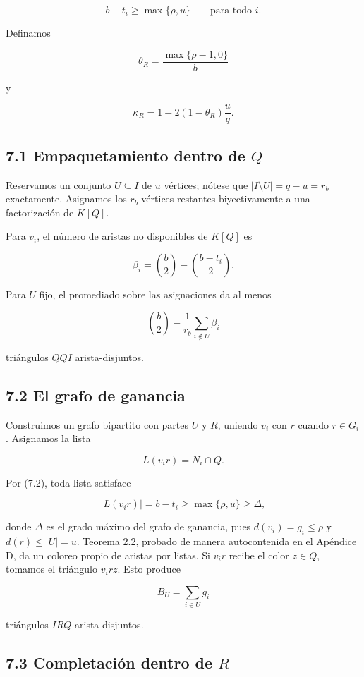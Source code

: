\documentclass[spanish,11pt,a4paper]{article}
\begin{document}
\[
b-t_i\ge\max\{\rho,u\}
\qquad
\text{para todo }i.
\tag{7.2}
\]

Definamos

\[
\theta_R=\frac{\max\{\rho-1,0\}}{b}
\]

y

\[
\kappa_R
=
1-2(1-\theta_R)\frac{u}{q}.
\tag{7.3}
\]

\subsection{\texorpdfstring{7.1 Empaquetamiento dentro de
\(Q\)}{7.1 Empaquetamiento dentro de Q}}\label{empaquetamiento-dentro-de-q}

Reservamos un conjunto \(U\subseteq I\) de \(u\) vértices; nótese que
\(|I\setminus U|=q-u=r_b\) exactamente. Asignamos los \(r_b\) vértices
restantes biyectivamente a una factorización de \(K[Q]\).

Para \(v_i\), el número de aristas no disponibles de \(K[Q]\) es

\[
\beta_i
=
\binom b2-\binom{b-t_i}{2}.
\tag{7.4}
\]

Para \(U\) fijo, el promediado sobre las asignaciones da al menos

\[
\binom b2-\frac1{r_b}\sum_{i\notin U}\beta_i
\tag{7.5}
\]

triángulos \(QQI\) arista-disjuntos.

\subsection{7.2 El grafo de ganancia}\label{el-grafo-de-ganancia}

Construimos un grafo bipartito con partes \(U\) y \(R\), uniendo \(v_i\)
con \(r\) cuando \(r\in G_i\). Asignamos la lista

\[
L(v_ir)=N_i\cap Q.
\]

Por (7.2), toda lista satisface

\[
|L(v_ir)|=b-t_i
\ge
\max\{\rho,u\}
\ge
\Delta,
\]

donde \(\Delta\) es el grado máximo del grafo de ganancia, pues
\(d(v_i)=g_i\le\rho\) y \(d(r)\le|U|=u\). Teorema 2.2, probado de manera
autocontenida en el Apéndice D, da un coloreo propio de aristas por
listas. Si \(v_ir\) recibe el color \(z\in Q\), tomamos el triángulo
\(v_irz\). Esto produce

\[
B_U=\sum_{i\in U}g_i
\]

triángulos \(IRQ\) arista-disjuntos.

\subsection{\texorpdfstring{7.3 Completación dentro de
\(R\)}{7.3 Completación dentro de R}}\label{completaciuxf3n-dentro-de-r}
\end{document}

